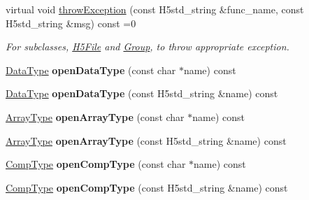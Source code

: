 \begin{DoxyCompactItemize}
\mbox{\label{class_h5_1_1_common_f_g_a4cb5086fb31b5b5befb933a963720e81}} 
virtual void \hyperlink{class_h5_1_1_common_f_g_a4cb5086fb31b5b5befb933a963720e81}{throw\+Exception} (const H5std\+\_\+string \&func\+\_\+name, const H5std\+\_\+string \&msg) const =0
\begin{DoxyCompactList}\small\item\em For subclasses, \hyperlink{class_h5_1_1_h5_file}{H5\+File} and \hyperlink{class_h5_1_1_group}{Group}, to throw appropriate exception. \end{DoxyCompactList}\item 
\mbox{\label{class_h5_1_1_common_f_g_a613dfbb09c4db06c0705e4d41debae2d}} 
\hyperlink{class_h5_1_1_data_type}{Data\+Type} {\bfseries open\+Data\+Type} (const char $\ast$name) const
\item 
\mbox{\label{class_h5_1_1_common_f_g_a68167212033619b310369523b3630ad2}} 
\hyperlink{class_h5_1_1_data_type}{Data\+Type} {\bfseries open\+Data\+Type} (const H5std\+\_\+string \&name) const
\item 
\mbox{\label{class_h5_1_1_common_f_g_a5940ab53b07119fda96517f22be2635e}} 
\hyperlink{class_h5_1_1_array_type}{Array\+Type} {\bfseries open\+Array\+Type} (const char $\ast$name) const
\item 
\mbox{\label{class_h5_1_1_common_f_g_ad32bfa20c7719b41f53e44120d0c2b93}} 
\hyperlink{class_h5_1_1_array_type}{Array\+Type} {\bfseries open\+Array\+Type} (const H5std\+\_\+string \&name) const
\item 
\mbox{\label{class_h5_1_1_common_f_g_a5b9654e5d21cfd32f605284c8c0dde10}} 
\hyperlink{class_h5_1_1_comp_type}{Comp\+Type} {\bfseries open\+Comp\+Type} (const char $\ast$name) const
\item 
\mbox{\label{class_h5_1_1_common_f_g_a9a627cffc4a9ab411b45ccf10a7ff4db}} 
\hyperlink{class_h5_1_1_comp_type}{Comp\+Type} {\bfseries open\+Comp\+Type} (const H5std\+\_\+string \&name) const
\item 
\mbox{\label{class_h5_1_1_common_f_g_a891656c02cf326edeadbfe67dafb41bc}} 

\end{DoxyCompactItemize}
